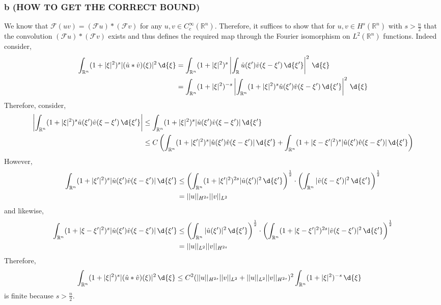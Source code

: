\documentclass[12pt]{article}
\newcommand{\R}{\mathbb{R}}
\renewcommand{\F}{\mathcal{F}}
\begin{document}
\subsubsection{b (HOW TO GET THE CORRECT BOUND)}

We know that $\F (uv) = (\F u) * (\F v)$ for any $u,v \in C^\infty_c(\R^n)$. Therefore, it suffices to show that for $u,v \in H^s(\R^n)$ with $s > \frac{n}{2}$ that the convolution  $(\F u) * (\F v)$ exists and thus defines the required map through the Fourier isomorphism on $L^2(\R^n)$ functions. Indeed consider,
\begin{align*}
\int_{\R^n} ( 1 + |\xi|^2)^s | (\hat{u} * \hat{v}) (\xi) |^2 \, \d{\xi} &=  \int_{\R^n} (1 + |\xi|^2)^s \left| \int_\R \hat{u}(\xi') \hat{v}(\xi - \xi') \, \d{\xi'} \right|^2 \, \d{\xi} 
\\
& = \int_{\R^n} (1 + |\xi|^2)^{-s} \left| \int_{\R^n} (1 + |\xi|^2)^s \hat{u}(\xi') \hat{v}(\xi - \xi') \, \d{\xi'} \right|^2 \, \d{\xi}  
\end{align*}
Therefore, consider,
\begin{align*}
\left| \int_{\R^n} (1 + |\xi|^2)^s \hat{u}(\xi') \hat{v}(\xi - \xi') \, \d{\xi'} \right| & \le \int_{\R^n} (1 + |\xi|^2)^s |\hat{u}(\xi') \hat{v}(\xi - \xi')| \, \d{\xi'} 
\\
& \le C \left( \int_{\R^n} (1 + |\xi'|^2)^s |\hat{u}(\xi') \hat{v}(\xi - \xi')| \, \d{\xi'} + \int_{\R^n} (1 + |\xi - \xi'|^2)^s |\hat{u}(\xi') \hat{v}(\xi - \xi')| \, \d{\xi'} \right)
\end{align*}
However,
\begin{align*}
\int_{\R^n} (1 + |\xi'|^2)^s |\hat{u}(\xi') \hat{v}(\xi - \xi')| \, \d{\xi'} & \le \left( \int_{\R^n} (1 + |\xi'|^2)^{2s} |\hat{u}(\xi')|^2 \, \d{\xi'} \right)^{\frac{1}{2}} \cdot \left( \int_{\R^n} |\hat{v}(\xi - \xi')|^2 \, \d{\xi'} \right)^{\frac{1}{2}}
\\
& = || u ||_{H^{2s}} || v ||_{L^2} 
\end{align*}
and likewise,
\begin{align*}
\int_{\R^n} (1 + |\xi - \xi'|^2)^{s}  |\hat{u}(\xi') \hat{v}(\xi - \xi')| \, \d{\xi'} & \le \left( \int_{\R^n} |\hat{u}(\xi')|^2 \, \d{\xi'} \right)^{\frac{1}{2}} \cdot \left( \int_{\R^n} (1 + |\xi - \xi'|^2)^{2s}  |\hat{v}(\xi - \xi')|^2 \, \d{\xi'} \right)^{\frac{1}{2}} 
\\
& = || u ||_{L^2} || v ||_{H^{2s}} 
\end{align*}
Therefore,
\begin{align*}
\int_{\R^n} ( 1 + |\xi|^2)^s | (\hat{u} * \hat{v}) (\xi) |^2 \, \d{\xi} & \le C^2 (|| u ||_{H^{2s}} || v ||_{L^2} + || u ||_{L^2} || v ||_{H^{2s}})^2  \int_{\R^n} (1 + |\xi|^2)^{-s} \, \d{\xi} 
\end{align*}
is finite because $s > \frac{n}{2}$.
\end{document}
